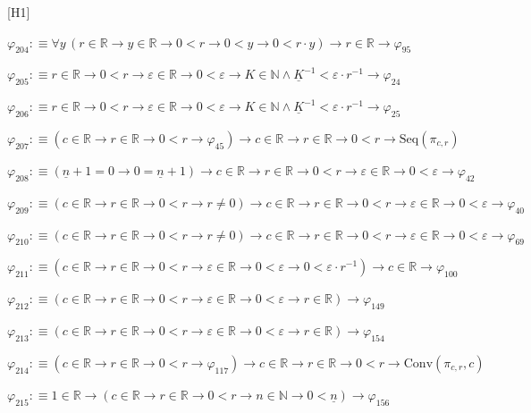\begin{fullproof}{[H1]}
\begin{abbrevlist}
\item $\varphi_{204} :\equiv \forall y\,(r \in \mathbb{R} \to y \in \mathbb{R} \to 0 < r \to 0 < y \to 0 < r \cdot y) \to r \in \mathbb{R} \to \varphi_{95}$
\item $\varphi_{205} :\equiv r \in \mathbb{R} \to 0 < r \to \varepsilon \in \mathbb{R} \to 0 < \varepsilon \to K \in \mathbb{N} \land \underline{K}^{-1} < \varepsilon \cdot r^{-1} \to \varphi_{24}$
\item $\varphi_{206} :\equiv r \in \mathbb{R} \to 0 < r \to \varepsilon \in \mathbb{R} \to 0 < \varepsilon \to K \in \mathbb{N} \land \underline{K}^{-1} < \varepsilon \cdot r^{-1} \to \varphi_{25}$
\item $\varphi_{207} :\equiv (c \in \mathbb{R} \to r \in \mathbb{R} \to 0 < r \to \varphi_{45}) \to c \in \mathbb{R} \to r \in \mathbb{R} \to 0 < r \to \mathrm{Seq}(\pi_{c,r})$
\item $\varphi_{208} :\equiv (\underline{n} + 1 = 0 \to 0 = \underline{n} + 1) \to c \in \mathbb{R} \to r \in \mathbb{R} \to 0 < r \to \varepsilon \in \mathbb{R} \to 0 < \varepsilon \to \varphi_{42}$
\item $\varphi_{209} :\equiv (c \in \mathbb{R} \to r \in \mathbb{R} \to 0 < r \to r \neq 0) \to c \in \mathbb{R} \to r \in \mathbb{R} \to 0 < r \to \varepsilon \in \mathbb{R} \to 0 < \varepsilon \to \varphi_{40}$
\item $\varphi_{210} :\equiv (c \in \mathbb{R} \to r \in \mathbb{R} \to 0 < r \to r \neq 0) \to c \in \mathbb{R} \to r \in \mathbb{R} \to 0 < r \to \varepsilon \in \mathbb{R} \to 0 < \varepsilon \to \varphi_{69}$
\item $\varphi_{211} :\equiv (c \in \mathbb{R} \to r \in \mathbb{R} \to 0 < r \to \varepsilon \in \mathbb{R} \to 0 < \varepsilon \to 0 < \varepsilon \cdot r^{-1}) \to c \in \mathbb{R} \to \varphi_{100}$
\item $\varphi_{212} :\equiv (c \in \mathbb{R} \to r \in \mathbb{R} \to 0 < r \to \varepsilon \in \mathbb{R} \to 0 < \varepsilon \to r \in \mathbb{R}) \to \varphi_{149}$
\item $\varphi_{213} :\equiv (c \in \mathbb{R} \to r \in \mathbb{R} \to 0 < r \to \varepsilon \in \mathbb{R} \to 0 < \varepsilon \to r \in \mathbb{R}) \to \varphi_{154}$
\item $\varphi_{214} :\equiv (c \in \mathbb{R} \to r \in \mathbb{R} \to 0 < r \to \varphi_{117}) \to c \in \mathbb{R} \to r \in \mathbb{R} \to 0 < r \to \mathrm{Conv}(\pi_{c,r},c)$
\item $\varphi_{215} :\equiv 1 \in \mathbb{R} \to (c \in \mathbb{R} \to r \in \mathbb{R} \to 0 < r \to n \in \mathbb{N} \to 0 < \underline{n}) \to \varphi_{156}$

\end{abbrevlist}
\end{fullproof}
